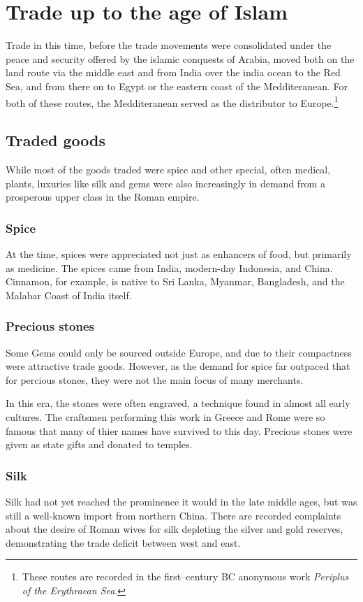 \documentclass[11pt, a4paper, headings=standardclasses]{scrartcl}
\begin{document}
\section{Trade up to the age of Islam}
Trade in this time, before the trade movements were consolidated under the peace and security offered by the islamic conquests of Arabia, moved both on the land route via the middle east and from India over the india ocean to the Red Sea, and from there on to Egypt or the eastern coast of the Medditeranean.\autocite[Chapter 7]{Rome} For both of these routes, the Medditeranean served as the distributor to Europe.\footnote{These routes are recorded in the first--century BC anonymous work \emph{Periplus of the Erythraean Sea}.}

\subsection{Traded goods}
While most of the goods traded were spice and other special, often medical, plants, luxuries like silk and gems were also increasingly in demand from a prosperous upper class in the Roman empire.\autocite{RIS}
\subsubsection{Spice}
At the time, spices were appreciated not just as enhancers of food, but primarily as medicine\autocite{MST}. The spices came from India, modern-day Indonesia, and China. Cinnamon, for example, is native to Sri Lanka, Myanmar, Bangladesh, and the Malabar Coast of India itself\autocite{Cinnamon}.
\subsubsection{Precious stones}
Some Gems could only be sourced outside Europe, and due to their compactness were attractive trade goods. However, as the demand for spice far outpaced that for percious stones\autocite{Rome}, they were not the main focus of many merchants.

In this era, the stones were often engraved, a technique found in almost all early cultures. The craftsmen performing this work in Greece and Rome were so famous that many of thier names have survived to this day. Precious stones were given as state gifts and donated to temples.\autocite{RG}
\subsubsection{Silk}
Silk had not yet reached the prominence it would in the late middle ages, but was still a well-known import from northern China. There are recorded complaints about the desire of Roman wives for silk depleting the silver and gold reserves, demonstrating the trade deficit between west and east.\autocite[Chapter 13]{Rome}
\end{document}
